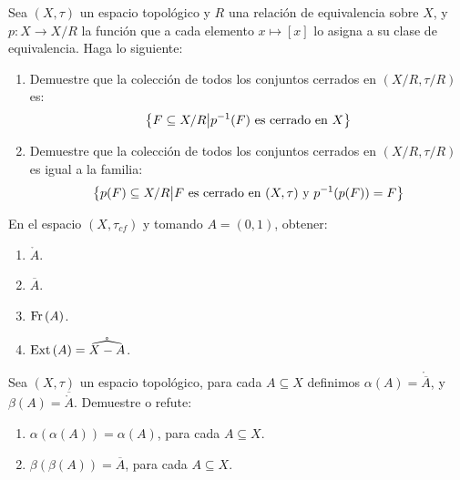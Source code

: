 \documentclass[12pt]{report}
\theoremstyle{largebreak}
\newcommand\cf[3]{\ensuremath{#1:#2\rightarrow#3}}
\newcommand{\Int}[1]{\ensuremath{\mathring{#1}}}
\newcommand{\Cls}[1]{\ensuremath{\overline{#1}}}
\newcommand{\Fr}[1]{\ensuremath{\textup{Fr}\left(#1\right)}}
\newcommand{\Ext}[1]{\ensuremath{\textup{Ext}\left(#1\right)}}
\begin{document}
    \begin{excer}
        Sea $(X,\tau)$ un espacio topológico y $R$ una relación de equivalencia sobre $X$, y $\cf{p}{X}{X/R}$ la función que a cada elemento $x\mapsto [x]$ lo asigna a su clase de equivalencia. Haga lo siguiente:
        \begin{enumerate}
            \item Demuestre que la colección de todos los conjuntos cerrados en $(X/R,\tau/R)$ es:
            \begin{equation*}
                \left\{F\subseteq X/R\big| p^{-1}(F) \textup{ es cerrado en }X \right\}
            \end{equation*}
            \item Demuestre que la colección de todos los conjuntos cerrados en $(X/R, \tau/R)$ es igual a la familia:
            \begin{equation*}
                \left\{p(F)\subseteq X/R\big| F\textup{ es cerrado en }(X,\tau)\textup{ y }p^{-1}(p(F))=F \right\}
            \end{equation*}
        \end{enumerate}
    \end{excer}

    \begin{sol}
        
    \end{sol}

    \begin{excer}
        En el espacio $(X,\tau_{cf})$ y tomando $A=(0,1)$, obtener:
        \begin{enumerate}
            \item $\Int{A}$.
            \item $\Cls{A}$.
            \item $\Fr{A}$.
            \item $\Ext{A}=\Int{\widehat{X-A}}$.
        \end{enumerate}
    \end{excer}

    \begin{sol}
        
    \end{sol}

    \begin{excer}
        Sea $(X,\tau)$ un espacio topológico, para cada $A\subseteq X$ definimos $\alpha(A)=\Int{\Cls{A}}$, y $\beta(A)=\Cls{\Int{A}}$. Demuestre o refute:
        \begin{enumerate}
            \item $\alpha(\alpha(A))=\alpha(A)$, para cada $A\subseteq X$.
            \item $\beta(\beta(A))=\Cls{A}$, para cada $A\subseteq X$.
        \end{enumerate}
    \end{excer}
\end{document}
